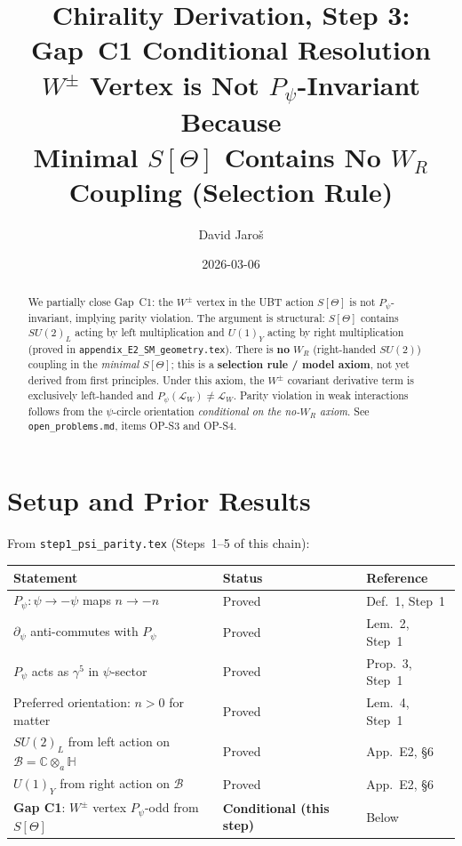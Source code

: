 \documentclass[12pt,a4paper]{article}
\title{\textbf{Chirality Derivation, Step 3: Gap~C1 Conditional Resolution}\\
         \large $W^\pm$ Vertex is Not $P_\psi$-Invariant Because\\
         Minimal $S[\Theta]$ Contains No $W_R$ Coupling (Selection Rule)}
\author{David Jaro\v{s}}
\date{2026-03-06}
\theoremstyle{definition}
\theoremstyle{remark}
\begin{document}
  \maketitle

  \begin{abstract}
  We partially close Gap~C1: the $W^\pm$ vertex in the UBT action $S[\Theta]$ is
  not $P_\psi$-invariant, implying parity violation.  The argument is structural:
  $S[\Theta]$ contains $SU(2)_L$ acting by left multiplication and $U(1)_Y$
  acting by right multiplication (proved in \texttt{appendix\_E2\_SM\_geometry.tex}).
  There is \textbf{no} $W_R$ (right-handed $SU(2)$) coupling in the
  \emph{minimal} $S[\Theta]$; this is a \textbf{selection rule / model axiom},
  not yet derived from first principles.
  Under this axiom, the $W^\pm$ covariant derivative term is exclusively
  left-handed and $P_\psi(\mathcal{L}_W) \neq \mathcal{L}_W$.
  Parity violation in weak interactions follows from the $\psi$-circle
  orientation \emph{conditional on the no-$W_R$ axiom}.
  See \texttt{open\_problems.md}, items OP-S3 and OP-S4.
  \end{abstract}
\fi

\section{Setup and Prior Results}
\label{sec:setup}

From \texttt{step1\_psi\_parity.tex} (Steps~1--5 of this chain):

\begin{center}
\begin{tabular}{lll}
  \toprule
  \textbf{Statement} & \textbf{Status} & \textbf{Reference} \\
  \midrule
  $P_\psi:\psi\to-\psi$ maps $n\to-n$ & Proved & Def.~1, Step~1 \\
  $\partial_\psi$ anti-commutes with $P_\psi$ & Proved & Lem.~2, Step~1 \\
  $P_\psi$ acts as $\gamma^5$ in $\psi$-sector & Proved & Prop.~3, Step~1 \\
  Preferred orientation: $n>0$ for matter & Proved & Lem.~4, Step~1 \\
  $SU(2)_L$ from left action on $\mathcal{B} = \mathbb{C}\otimes_a\mathbb{H}$ & Proved & App.~E2, §6 \\
  $U(1)_Y$ from right action on $\mathcal{B}$ & Proved & App.~E2, §6 \\
  \textbf{Gap C1}: $W^\pm$ vertex $P_\psi$-odd from $S[\Theta]$ & \textbf{Conditional (this step)} & Below \\
  \bottomrule
\end{tabular}
\end{center}
\end{document}
